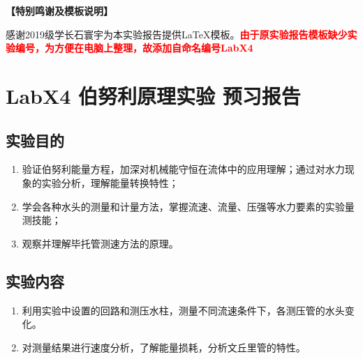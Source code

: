\documentclass[dvipsnames, svgnames,a4paper,11pt]{article}
\begin{document}
	
	\textbf{【特别鸣谢及模板说明】}	
	
	感谢2019级学长石寰宇为本实验报告提供\LaTeX 模板。\textcolor{red}{\textbf{由于原实验报告模板缺少实验编号，为方便在电脑上整理，故添加自命名编号LabX4}}
	
	
	
	\clearpage
	\tableofcontents
	\clearpage
	
	
	
	\setcounter{section}{0}
	\section{LabX4 伯努利原理实验 \quad\heiti 预习报告}
	
	\subsection{实验目的}
	\begin{enumerate}
		\item 验证伯努利能量方程，加深对机械能守恒在流体中的应用理解；通过对水力现象的实验分析，理解能量转换特性；
		\item 学会各种水头的测量和计量方法，掌握流速、流量、压强等水力要素的实验量测技能；
		\item 观察并理解毕托管测速方法的原理。
	\end{enumerate}
	
	\subsection{实验内容}
	\begin{enumerate}
		\item 利用实验中设置的回路和测压水柱，测量不同流速条件下，各测压管的水头变化。
		\item 对测量结果进行速度分析，了解能量损耗，分析文丘里管的特性。
	\end{enumerate}
	
\end{document}
